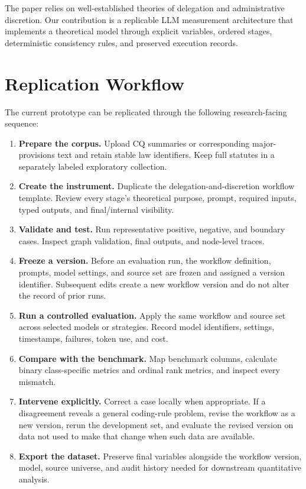 \documentclass[conference]{IEEEtran}
\begin{document}
The paper relies on well-established theories of delegation and administrative discretion. Our contribution is a replicable LLM measurement architecture that implements a theoretical model through explicit variables, ordered stages, deterministic consistency rules, and preserved execution records.


\section{Replication Workflow}

The current prototype can be replicated through the following research-facing sequence:
\begin{enumerate}[nosep]
  \item \textbf{Prepare the corpus.} Upload CQ summaries or corresponding major-provisions text and retain stable law identifiers. Keep full statutes in a separately labeled exploratory collection.
  \item \textbf{Create the instrument.} Duplicate the delegation-and-discretion workflow template. Review every stage's theoretical purpose, prompt, required inputs, typed outputs, and final/internal visibility.
  \item \textbf{Validate and test.} Run representative positive, negative, and boundary cases. Inspect graph validation, final outputs, and node-level traces.
  \item \textbf{Freeze a version.} Before an evaluation run, the workflow definition, prompts, model settings, and source set are frozen and assigned a version identifier. Subsequent edits create a new workflow version and do not alter the record of prior runs.
  \item \textbf{Run a controlled evaluation.} Apply the same workflow and source set across selected models or strategies. Record model identifiers, settings, timestamps, failures, token use, and cost.
  \item \textbf{Compare with the benchmark.} Map benchmark columns, calculate binary class-specific metrics and ordinal rank metrics, and inspect every mismatch.
  \item \textbf{Intervene explicitly.} Correct a case locally when appropriate. If a disagreement reveals a general coding-rule problem, revise the workflow as a new version, rerun the development set, and evaluate the revised version on data not used to make that change when such data are available.
  \item \textbf{Export the dataset.} Preserve final variables alongside the workflow version, model, source universe, and audit history needed for downstream quantitative analysis.
\end{enumerate}
\end{document}
